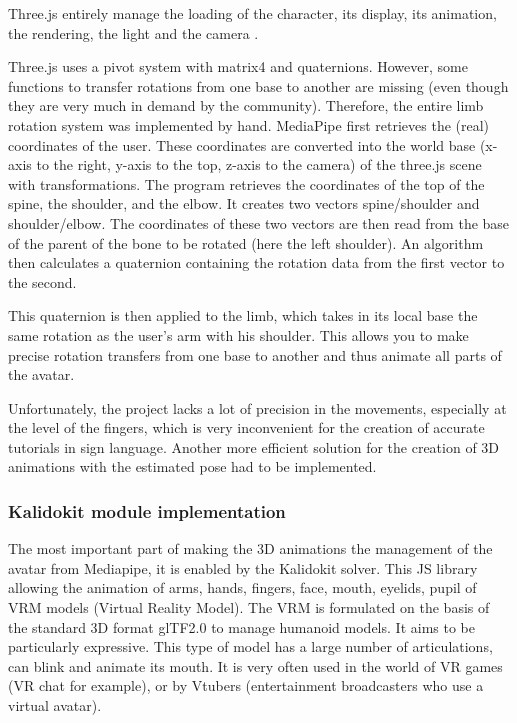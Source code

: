 Three.js entirely manage the loading of the character, its display, its animation, the rendering, the light and the camera .

Three.js uses a pivot system with matrix4 and quaternions. However, some functions to transfer rotations from one base to
another are missing (even though they are very much in demand by the community). Therefore, the entire limb rotation system was implemented by hand.
MediaPipe first retrieves the (real) coordinates of the user. These coordinates are converted into the world base (x-axis to the right, y-axis to the top, z-axis to the camera) of the three.js scene with transformations. The program retrieves the coordinates of the top of the spine, the shoulder, and the elbow. It creates two vectors spine/shoulder and shoulder/elbow. The coordinates of these two vectors are then read from the base of the parent of the bone to be rotated (here the left shoulder). An algorithm then calculates a quaternion containing the rotation data from the first vector to the second.

This quaternion is then applied to the limb, which takes in its local base the same rotation as the user’s arm with his shoulder.
This allows you to make precise rotation transfers from one base to another and thus animate all parts of the avatar.

Unfortunately, the project lacks a lot of precision in the movements, especially at the level of the fingers, which is very inconvenient for the creation of accurate tutorials in sign language. Another more efficient solution for the creation of 3D animations with the estimated pose had to be implemented.

\subsubsection{Kalidokit module implementation}

The most important part of making the 3D animations the management of the avatar from Mediapipe, it is enabled by the Kalidokit solver. This JS library allowing the animation of arms, hands, fingers, face, mouth, eyelids, pupil of VRM models (Virtual Reality Model). The VRM is formulated on the basis of the standard 3D format glTF2.0 to manage humanoid models. It aims to be particularly expressive. This type of model has a large number of articulations, can blink and animate its mouth. It is very often used in the world of VR games (VR chat for example), or by Vtubers (entertainment broadcasters who use a virtual avatar).  

